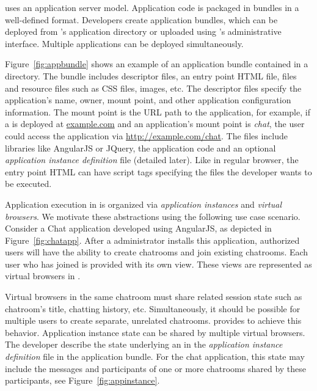 \cb uses an application server model.  Application code is packaged in
bundles in a well-defined format.
Developers create application bundles, which can be deployed
from \cb's application directory or uploaded using \cb's administrative
interface.  Multiple applications can be deployed simultaneously.

Figure~\ref{fig:appbundle} shows an example of an \cb application bundle
contained in a directory.
The bundle includes descriptor files, an entry point HTML file,
\js files and resource files such as CSS files, images, etc.
The descriptor files specify the application's name, owner, mount point, and
other application configuration information.
The mount point is the URL path to the application, for example,
if a \cb is deployed at \url{example.com} and an application's mount point is
\emph{chat}, the user could access the application via \url{http://example.com/chat}.
The \js files include libraries like AngularJS or JQuery, 
the application code and an optional \emph{application instance definition}
file (detailed later).
Like in regular browser, the entry point HTML can have script tags
specifying the \js files the developer wants to be executed.

\chatappfig{}

\appinstancefig{}

%
Application execution in \cb is organized via \emph{application
instances} and \emph{virtual browsers}.  
We motivate these abstractions using the following use case scenario.
Consider a Chat application developed using
AngularJS, as depicted in Figure~\ref{fig:chatapp}. After a \cb administrator 
installs this application, authorized users will have the ability to
create chatrooms and join existing chatrooms.  Each user who has joined is
provided with its own view.
These views are represented as virtual browsers in \cb. 

Virtual browsers in the same chatroom must share related session state such
as chatroom's title, chatting history, etc. Simultaneously, it should be
possible for multiple users to create separate, unrelated chatrooms.
\cb provides \appins to achieve this behavior. Application instance state 
can be shared by multiple virtual browsers. The developer
describe the state underlying an \appins{} in the \emph{application instance
definition} file in the application bundle. For the chat application, this state
may include the messages and participants of one or more chatrooms shared
by these participants, see Figure~\ref{fig:appinstance}. 

